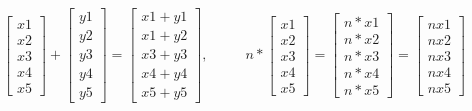 \documentclass[a4paper]{article}
\begin{document}
$
\begin{bmatrix} 
x1\\x2\\x3\\x4\\x5
\end{bmatrix}
+
\begin{bmatrix} 
y1\\y2\\y3\\y4\\y5
\end{bmatrix}
=
\begin{bmatrix} 
x1+y1\\x1+y2\\x3+y3\\x4+y4\\x5+y5
\end{bmatrix}
,
\ \ \ \ \ \ \ \ \ \ \ \ 
n *
\begin{bmatrix} 
x1\\x2\\x3\\x4\\x5
\end{bmatrix}
=
\begin{bmatrix} 
n *x1\\n* x2\\n*x3\\n*x4\\n*x5
\end{bmatrix}
=
\begin{bmatrix} 
nx1\\nx2\\nx3\\nx4\\nx5
\end{bmatrix}
$
\end{document}
